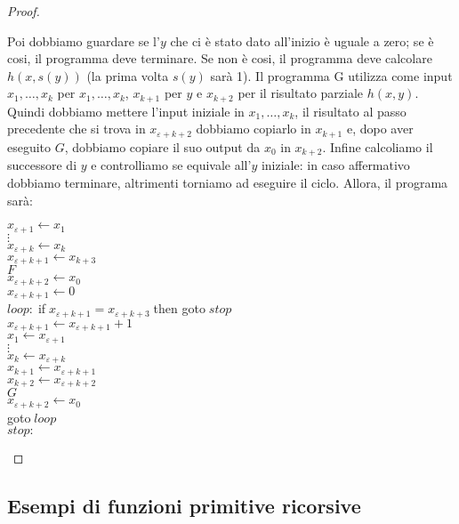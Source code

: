 \begin{proof}
\begin{enumerate}
Poi dobbiamo guardare se l'$y$ che ci è stato dato all'inizio è uguale
a zero; se è cosi, il programma deve terminare. Se non è cosi, il
programma deve calcolare $h(x,s(y))$ (la prima volta $s(y)$ sarà
1). Il programma G utilizza come input $x_{1},\dots,x_{k}$ per
$x_{1},\dots,x_{k}$, $x_{k+1}$ per $y$ e $x_{k+2}$ per il risultato
parziale $h(x,y)$. Quindi dobbiamo mettere l'input iniziale in
$x_{1},\dots,x_{k}$, il risultato al passo precedente che si trova in
$x_{\varepsilon+k+2}$ dobbiamo copiarlo in $x_{k+1}$ e, dopo aver
eseguito $G$, dobbiamo copiare il suo output da $x_{0}$ in $x_{k+2}$.
Infine calcoliamo il successore di $y$ e controlliamo se equivale
all'$y$ iniziale: in caso affermativo dobbiamo terminare, altrimenti
torniamo ad eseguire il ciclo. Allora, il programa sarà:

\begin{mylisting}
$x_{\varepsilon+1}\leftarrow x_{1}$\\
$\vdots$\\
$x_{\varepsilon+k}\leftarrow x_{k}$\\
$x_{\varepsilon+k+1}\leftarrow x_{k+3}$\\
$F$\\
$x_{\varepsilon+k+2}\leftarrow x_{0}$\\
$x_{\varepsilon+k+1}\leftarrow 0$\\
$loop:\; $if$\; x_{\varepsilon+k+1}=x_{\varepsilon+k+3}\; $then goto$\;stop$\\
$x_{\varepsilon+k+1}\leftarrow x_{\varepsilon+k+1}+1$\\
$x_{1}\leftarrow x_{\varepsilon+1}$\\
$\vdots$\\
$x_{k}\leftarrow x_{\varepsilon+k}$\\
$x_{k+1}\leftarrow x_{\varepsilon+k+1}$\\
$x_{k+2} \leftarrow x_{\varepsilon+k+2}$\\
$G$\\
$x_{\varepsilon+k+2} \leftarrow x_0$\\
goto$\; loop$\\
$stop:$
\end{mylisting}
\end{enumerate}
\end{proof}

\subsection{Esempi di funzioni primitive ricorsive}


